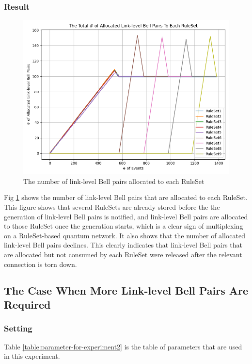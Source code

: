 \subsubsection{Result}

\begin{figure}[H]
  \centerline{\includegraphics[width=.6\columnwidth]{images/result1.png}}
  \caption{The number of link-level Bell pairs allocated to each RuleSet}
  \label{fig:result1}
\end{figure}

Fig \ref{fig:result1} shows the number of link-level Bell pairs that are allocated to each RuleSet.
This figure shows that several RuleSets are already stored before the the generation of link-level Bell pairs is notified, and link-level Bell pairs are allocated to those RuleSet once the generation starts, which is a clear sign of multiplexing on a RuleSet-based quantum network.
It also shows that the number of allocated link-level Bell pairs declines.  This clearly indicates that link-level Bell pairs that are allocated but not consumed by each RuleSet were released after the relevant connection is torn down.

\newpage

\subsection{The Case When More Link-level Bell Pairs Are Required}

\subsubsection{Setting}
Table \ref{table:parameter-for-experiment2} is the table of parameters that are used in this experiment.

